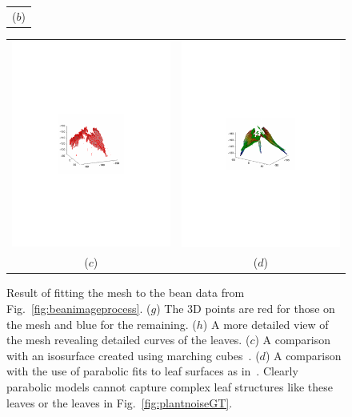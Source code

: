 \begin{figure}
\begin{center}
\begin{tabular}{c}
($b$) \\
\end{tabular}
\begin{tabular}{cc}
\includegraphics[trim=190 280 190 290,clip,width=0.49\linewidth]{Figures/bean3DIsosurface} &
\includegraphics[trim=190 280 190 290,clip,width=0.49\linewidth]{Figures/beanParabolic} \\
($c$) & ($d$) \\
\end{tabular}
\end{center}
   \caption{ Result of fitting the mesh to the bean data from Fig.~\ref{fig:beanimageprocess}.  ($g$)  The $3$D points are red for those on the mesh and blue for the remaining.  ($h$) A more detailed view of the mesh revealing detailed curves of the leaves. ($c$) A comparison with an isosurface created using marching cubes~\cite{}. ($d$) A comparison with the use of parabolic fits to leaf surfaces as in~\cite{Alenya2011,Alenya2013}.  Clearly parabolic models cannot capture complex leaf structures like these leaves or the leaves in Fig.~\ref{fig:plantnoiseGT}. }
\label{fig:beanfit}
\end{figure}

